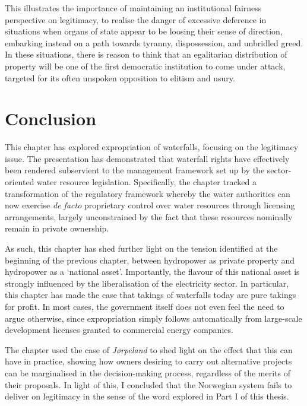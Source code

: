 {This illustrates the importance of maintaining an institutional fairness perspective on legitimacy, to realise the danger of excessive deference in situations when organs of state appear to be loosing their sense of direction, embarking instead on a path towards tyranny, dispossession, and unbridled greed. In these situations, there is reason to think that an egalitarian distribution of property will be one of the first democratic institution to come under attack, targeted for its often unspoken opposition to elitism and usury.
}
\section{Conclusion}\label{sec:5:8}

This chapter has explored expropriation of waterfalls, focusing on the legitimacy issue. The presentation has demonstrated that waterfall rights have effectively been rendered subservient to the management framework set up by the sector-oriented water resource legislation. Specifically, the chapter tracked a transformation of the regulatory framework whereby the water authorities can now exercise {\it de facto} proprietary control over water resources through licensing arrangements, largely unconstrained by the fact that these resources nominally remain in private ownership.

As such, this chapter has shed further light on the tension identified at the beginning of the previous chapter, between hydropower as private property and hydropower as a `national asset'. Importantly, the flavour of this national asset is strongly influenced by the liberalisation of the electricity sector. In particular, this chapter has made the case that takings of waterfalls today are pure takings for profit. In most cases, the government itself does not even feel the need to argue otherwise, since expropriation simply follows automatically from large-scale development licenses granted to commercial energy companies.

The chapter used the case of {\it Jørpeland} to shed light on the effect that this can have in practice, showing how owners desiring to carry out alternative projects can be marginalised in the decision-making process, regardless of the merits of their proposals. In light of this, I concluded that the Norwegian system fails to deliver on legitimacy in the sense of the word explored in Part I of this thesis. 

